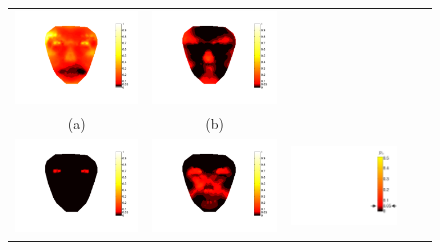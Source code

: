 \begin{figure}[t!]
\begin{center}%

\begin{tabular}{c c c c c}
 \includegraphics[height=0.3\columnwidth]{fc1-2.pdf}&
  \includegraphics[height=0.3\columnwidth]{fc3-4.pdf} & \\ 
  (a)& (b)&\\
  \includegraphics[height=0.3\columnwidth]{fc1-3.pdf}&
  \includegraphics[height=0.3\columnwidth]{fc2-4.pdf}   &\includegraphics[height=0.3\columnwidth]{fc_legend.pdf}  \\

\end{tabular}
\end{center}
\end{figure}

